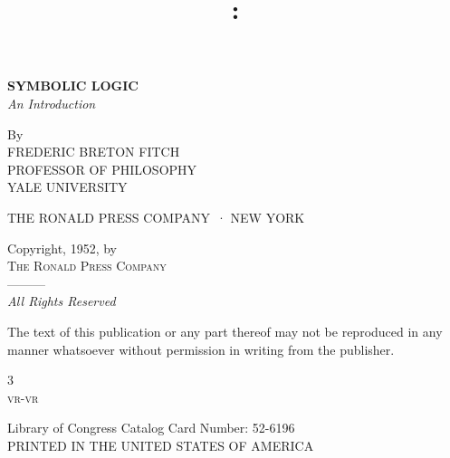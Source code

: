 \documentclass{book}
\title{\titleContent: \subtitleContent}
\author{\authorContent}
\date{}
\newcommand*{\titleContent}{Symbolic Logic}
\newcommand*{\subtitleContent}{An Introduction}
\newcommand*{\authorContent}{Frederic Breton Fitch}
\newcommand*{\publisherContent}{The Ronald Press Company}
\begin{document}
\frontmatter
\pagestyle{fmatter}

\begin{titlepage}
  \begin{center}
    \MakeUppercase{
      \Huge\bfseries\titleContent} \\[2em]
      \huge\itshape\subtitleContent
    \end{center}
  \begin{center}
    By \\[1em]
    \MakeUppercase{
      \authorContent \\[1em]
      \tiny Professor of Philosophy \\
      Yale University}
  \end{center}
  \begin{center}
    \MakeUppercase{\publisherContent\ · New York}
  \end{center}
\end{titlepage}

\thispagestyle{empty}
\begin{center}
  Copyright, 1952, by \\[1ex]
  \textsc{\publisherContent} \\[1ex]
  ———\\[1ex]
  \textit{All Rights Reserved} \\[1em]
  \begin{minipage}{2in}
    \footnotesize The text of this publication or any part thereof may not be reproduced in any manner whatsoever without permission in writing from the publisher.
  \end{minipage}


  3 \\
  \textsc{vr-vr}
\end{center}
\begin{center}
  \small Library of Congress Catalog Card Number: 52-6196 \\
  \MakeUppercase{\tiny Printed in the United States of America}
\end{center}
\end{document}
